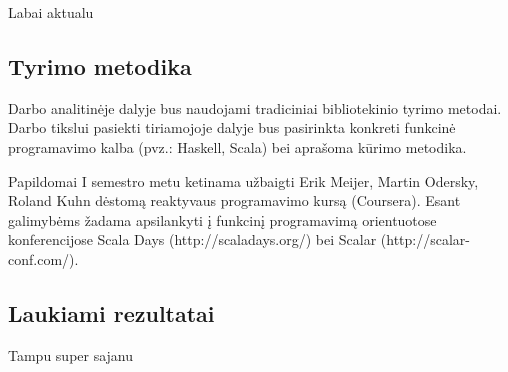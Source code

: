 \documentclass[12pt, a4paper, lithuanian]{article}
\begin{document}
Labai aktualu

\subsection{Tyrimo metodika}

    Darbo analitinėje dalyje bus naudojami tradiciniai bibliotekinio tyrimo metodai. Darbo tikslui pasiekti tiriamojoje dalyje bus pasirinkta konkreti funkcinė programavimo kalba (pvz.: Haskell, Scala) bei aprašoma kūrimo metodika.

    Papildomai I semestro metu ketinama užbaigti Erik Meijer, Martin Odersky, Roland Kuhn dėstomą reaktyvaus programavimo kursą (Coursera). Esant galimybėms žadama apsilankyti į funkcinį programavimą orientuotose konferencijose Scala Days (http://scaladays.org/) bei Scalar (http://scalar-conf.com/).

\subsection{Laukiami rezultatai}

Tampu super sajanu

\nocite{*}

\end{document}
